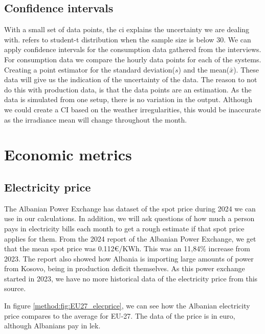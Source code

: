 \subsection{Confidence intervals}
With a small set of data points, the \acrfull{ci} explains the uncertainty we are dealing with. \citep{lovasStatistikkUniversiteterOg2018} refers to student-t distribution when the sample size is below 30. We can apply confidence intervals for the consumption data gathered from the interviews. For consumption data we compare the hourly data points for each of the systems. Creating a point estimator for the standard deviation($s$) and the mean($\bar{x}$). These data will give us the indication of the uncertainty of the data. The reason to not do this with production data, is that the data points are an estimation. As the data is simulated from one setup, there is no variation in the output. Although we could create a CI based on the weather irregularities, this would be inaccurate as the irradiance mean will change throughout the month. 
\section{Economic metrics}

\subsection{Electricity price}
The Albanian Power Exchange has dataset of the spot price during 2024 we can use in our calculations\citep{albanianpowerexchangeDAMAlbania20242025}. In addition, we will ask questions of how much a person pays in electricity bills each month to get a rough estimate if that spot price applies for them. From the 2024 report of the Albanian Power Exchange, we get that the mean spot price was 0.112€/KWh. This was an 11,84\% increase from 2023. The report also showed how Albania is importing large amounts of power from Kosovo, being in production deficit themselves. As this power exchange started in 2023, we have no more historical data of the electricity price from this source. 

In figure \ref{method:fig:EU27_elecprice}, we can see how the Albanian electricity price compares to the average for EU-27. The data of the price is in \acrfull{euro}, although Albanians pay in \acrfull{lek}. 

